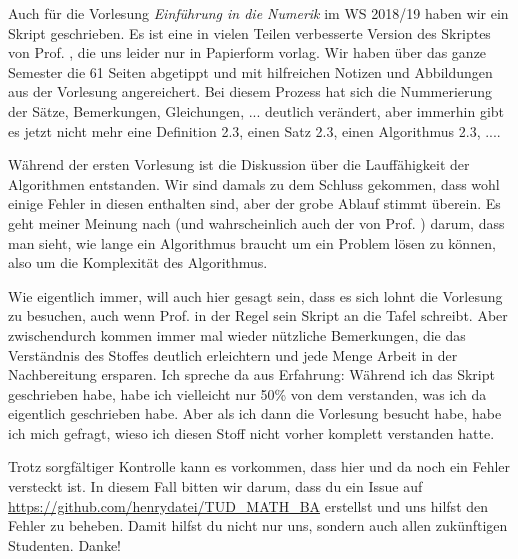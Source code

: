 Auch für die Vorlesung \textit{Einführung in die Numerik} im WS 2018/19 haben wir ein Skript geschrieben. Es ist eine in vielen Teilen verbesserte Version des Skriptes von Prof. , die uns leider nur in Papierform vorlag. Wir haben über das ganze Semester die 61 Seiten abgetippt und mit hilfreichen Notizen und Abbildungen aus der Vorlesung angereichert. Bei diesem Prozess hat sich die Nummerierung der Sätze, Bemerkungen, Gleichungen, ... deutlich verändert, aber immerhin gibt es jetzt nicht mehr eine Definition 2.3, einen Satz 2.3, einen Algorithmus 2.3, ....

Während der ersten Vorlesung ist die Diskussion über die Lauffähigkeit der Algorithmen entstanden. Wir sind damals zu dem Schluss gekommen, dass wohl einige Fehler in diesen enthalten sind, aber der grobe Ablauf stimmt überein. Es geht meiner Meinung nach (und wahrscheinlich auch der von Prof. ) darum, dass man sieht, wie lange ein Algorithmus braucht um ein Problem lösen zu können, also um die Komplexität des Algorithmus.

Wie eigentlich immer, will auch hier gesagt sein, dass es sich lohnt die Vorlesung zu besuchen, auch wenn Prof.  in der Regel sein Skript an die Tafel schreibt. Aber zwischendurch kommen immer mal wieder nützliche Bemerkungen, die das Verständnis des Stoffes deutlich erleichtern und jede Menge Arbeit in der Nachbereitung ersparen. Ich spreche da aus Erfahrung: Während ich das Skript geschrieben habe, habe ich vielleicht nur 50\% von dem verstanden, was ich da eigentlich geschrieben habe. Aber als ich dann die Vorlesung besucht habe, habe ich mich gefragt, wieso ich diesen Stoff nicht vorher komplett verstanden hatte.

Trotz sorgfältiger Kontrolle kann es vorkommen, dass hier und da noch ein Fehler versteckt ist. In diesem Fall bitten wir darum, dass du ein Issue auf \url{https://github.com/henrydatei/TUD_MATH_BA} erstellst und uns hilfst den Fehler zu beheben. Damit hilfst du nicht nur uns, sondern auch allen zukünftigen Studenten. Danke!